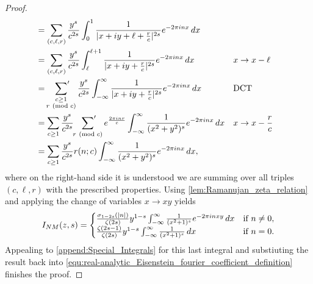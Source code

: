 \begin{proof}
\begin{align*}
          &= \sum_{(c,\ell,r)}\frac{y^{s}}{c^{2s}}\int_{0}^{1}\frac{1}{|x+iy+\ell+\frac{r}{c}|^{2s}}e^{-2\pi inx}\,dx \\
          &= \sum_{(c,\ell,r)}\frac{y^{s}}{c^{2s}}\int_{\ell}^{\ell+1}\frac{1}{|x+iy+\frac{r}{c}|^{2s}}e^{-2\pi inx}\,dx &&\text{$x \to x-\ell$} \\
          &= \sideset{}{'}\sum_{\substack{c \ge 1 \\ r \ \left(\text{mod }c\right)}}\frac{y^{s}}{c^{2s}}\int_{-\infty}^{\infty}\frac{1}{|x+iy+\frac{r}{c}|^{2s}}e^{-2\pi inx}\,dx &&\text{DCT} \\
          &= \sum_{c \ge 1}\frac{y^{s}}{c^{2s}}\sideset{}{'}\sum_{r \ \left(\text{mod }c\right)}e^{\frac{2\pi inr}{c}}\int_{-\infty}^{\infty}\frac{1}{(x^{2}+y^{2})^{s}}e^{-2\pi inx}\,dx &&\text{$x \to x-\frac{r}{c}$} \\
          &= \sum_{c \ge 1}\frac{y^{s}}{c^{2s}}r(n;c)\int_{-\infty}^{\infty}\frac{1}{(x^{2}+y^{2})^{s}}e^{-2\pi inx}\,dx,
        \end{align*}
        where on the right-hand side it is understood we are summing over all triples $(c,\ell,r)$ with the prescribed properties. Using \cref{lem:Ramanujan_zeta_relation} and applying the change of variables $x \to xy$ yields
        \[
         I_{NM}(z,s) = \begin{cases} \frac{\sigma_{1-2s}(|n|)}{\zeta(2s)}y^{1-s}\int_{-\infty}^{\infty}\frac{1}{(x^{2}+1)^{s}}e^{-2\pi inxy}\,dx & \text{if $n \neq 0$}, \\ \frac{\zeta(2s-1)}{\zeta(2s)}y^{1-s}\int_{-\infty}^{\infty}\frac{1}{(x^{2}+1)^{s}}\,dx & \text{if $n = 0$}. \end{cases}
        \]
        Appealing to \cref{append:Special_Integrals} for this last integral and substiuting the result back into \cref{equ:real-analytic_Eisenstein_fourier_coefficient_definition} finishes the proof.
      \end{proof}
